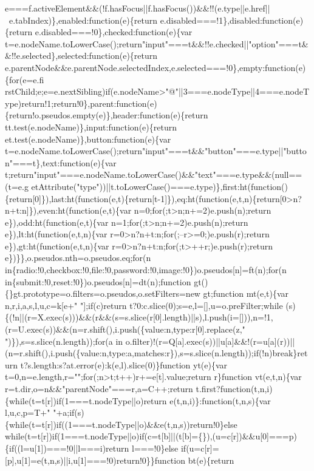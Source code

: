\begin{DoxyCode}
{       e===f.activeElement&&(!f.hasFocus||f.hasFocus())&&!!(e.type||e.href||~e.tabIndex)\},enabled:function(e)\{return e.disabled===!1\},disabled:function(e)\{return
       e.disabled===!0\},checked:function(e)\{var
       t=e.nodeName.toLowerCase();return"input"===t&&!!e.checked||"option"===t&&!!e.selected\},selected:function(e)\{return
       e.parentNode&&e.parentNode.selectedIndex,e.selected===!0\},empty:function(e)\{for(e=e.fi
      rstChild;e;e=e.nextSibling)if(e.nodeName>"@"||3===e.nodeType||4===e.nodeType)return!1;return!0\},parent:function(e)\{return!o.pseudos.empty(e)\},header:function(e)\{return tt.test(e.nodeName)\},input:function(e)\{return
       et.test(e.nodeName)\},button:function(e)\{var
       t=e.nodeName.toLowerCase();return"input"===t&&"button"===e.type||"button"===t\},text:function(e)\{var
       t;return"input"===e.nodeName.toLowerCase()&&"text"===e.type&&(null==(t=e.g
      etAttribute("type"))||t.toLowerCase()===e.type)\},first:ht(function()\{return[0]\}),last:ht(function(e,t)\{return[t-1]\}),eq:ht(function(e,t,n)\{return[0>n?n+t:n]\}),even:ht(function(e,t)\{var
       n=0;for(;t>n;n+=2)e.push(n);return e\}),odd:ht(function(e,t)\{var n=1;for(;t>n;n+=2)e.push(n);return e\}),lt:ht(function(e,t,n)\{var
       r=0>n?n+t:n;for(;--r>=0;)e.push(r);return e\}),gt:ht(function(e,t,n)\{var r=0>n?n+t:n;for(;t>++r;)e.push(r);return
       e\})\}\},o.pseudos.nth=o.pseudos.eq;for(n
       in\{radio:!0,checkbox:!0,file:!0,password:!0,image:!0\})o.pseudos[n]=ft(n);for(n in\{submit:!0,reset:!0\})o.pseudos[n]=dt(n);function
       gt()\{\}gt.prototype=o.filters=o.pseudos,o.setFilters=new gt;function mt(e,t)\{var n,r,i,a,s,l,u,c=k[e+" "];if(c)return
       t?0:c.slice(0);s=e,l=[],u=o.preFilter;while
      (s)\{(!n||(r=X.exec(s)))&&(r&&(s=s.slice(r[0].length)||s),l.push(i=[])),n=!1,(r=U.exec(s))&&(n=r.shift(),i.push(\{value:n,type:r[0].replace(z," ")\}),s=s.slice(n.length));for(a in
       o.filter)!(r=Q[a].exec(s))||u[a]&&!(r=u[a](r))||(n=r.shift(),i.push(\{value:n,type:a,matches:r\}),s=s.slice(n.length));if(!n)break\}return
       t?s.length:s?at.error(e):k(e,l).slice(0)\}function yt(e)\{var t=0,n=e.length,r="";for(;n>t;t++)r+=e[t].value;return
       r\}function vt(e,t,n)\{var r=t.dir,o=n&&"parentNode"===r,a=C++;return
       t.first?function(t,n,i)\{while(t=t[r])if(1===t.nodeType||o)return e(t,n,i)\}:function(t,n,s)\{var l,u,c,p=T+"
       "+a;if(s)\{while(t=t[r])if((1===t.nodeType||o)&&e(t,n,s))return!0\}else
       while(t=t[r])if(1===t.nodeType||o)if(c=t[b]||(t[b]=\{\}),(u=c[r])&&u[0]===p)\{if((l=u[1])===!0||l===i)return l===!0\}else if(u=c[r]=[p],u[1]=e(t,n,s)||i,u[1]===!0)return!0\}\}function bt(e)\{return
}
\end{DoxyCode}
